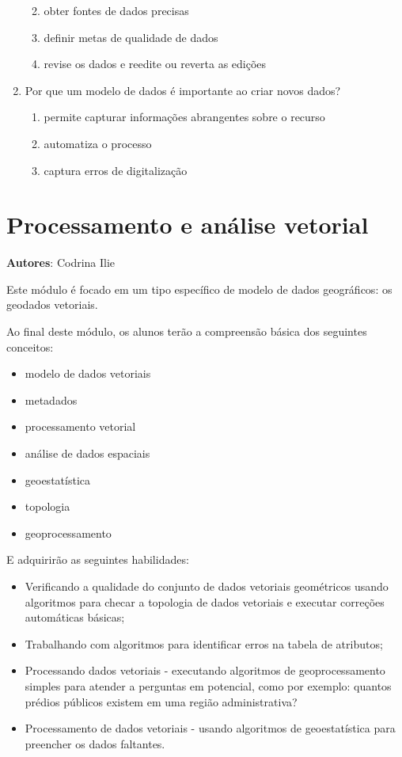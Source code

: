 \documentclass[
]{krantz}
\providecommand{\tightlist}{%
  \setlength{\itemsep}{0pt}\setlength{\parskip}{0pt}}
\begin{document}
\begin{enumerate}
  \begin{enumerate}
  \def\labelenumii{\alph{enumii}.}
  \item
    obter fontes de dados precisas
  \item
    definir metas de qualidade de dados
  \item
    revise os dados e reedite ou reverta as edições
  \end{enumerate}
\item
  Por que um modelo de dados é importante ao criar novos dados?

  \begin{enumerate}
  \def\labelenumii{\alph{enumii}.}
  \item
    permite capturar informações abrangentes sobre o recurso
  \item
    automatiza o processo
  \item
    captura erros de digitalização
  \end{enumerate}
\end{enumerate}

\hypertarget{processamento-e-anuxe1lise-vetorial}{%
\chapter{Processamento e análise vetorial}\label{processamento-e-anuxe1lise-vetorial}}

\textbf{Autores}: Codrina Ilie

Este módulo é focado em um tipo específico de modelo de dados geográficos: os geodados vetoriais.

Ao final deste módulo, os alunos terão a compreensão básica dos seguintes conceitos:

\begin{itemize}
\tightlist
\item
  modelo de dados vetoriais
\item
  metadados
\item
  processamento vetorial
\item
  análise de dados espaciais
\item
  geoestatística
\item
  topologia
\item
  geoprocessamento
\end{itemize}

E adquirirão as seguintes habilidades:

\begin{itemize}
\tightlist
\item
  Verificando a qualidade do conjunto de dados vetoriais geométricos usando algoritmos para checar a topologia de dados vetoriais e executar correções automáticas básicas;
\item
  Trabalhando com algoritmos para identificar erros na tabela de atributos;
\item
  Processando dados vetoriais - executando algoritmos de geoprocessamento simples para atender a perguntas em potencial, como por exemplo: quantos prédios públicos existem em uma região administrativa?
\item
  Processamento de dados vetoriais - usando algoritmos de geoestatística para preencher os dados faltantes.
\end{itemize}
\end{document}
